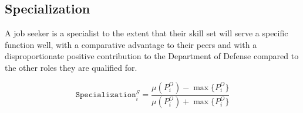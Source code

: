 \subsection{Specialization}

A job seeker is a specialist to the extent that their skill set will serve a specific function well, with a comparative advantage to their peers and with a disproportionate positive contribution to the Department of Defense compared to the other roles they are qualified for.

\[\texttt{Specialization}^S_i = \frac{\mu(P^O_i) - \max\{P^O_i\}}{\mu(P^O_i) + \max\{P^O_i\}}\]